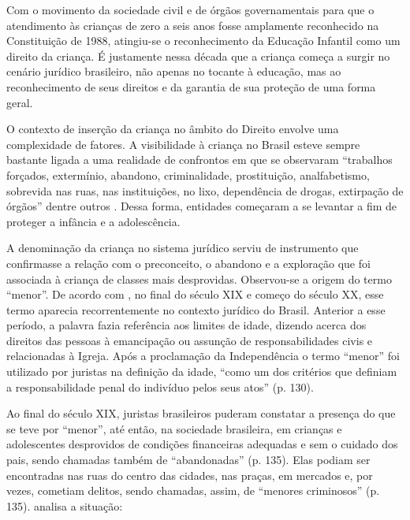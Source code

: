 
Com o movimento da sociedade civil e de órgãos governamentais para que o atendimento às crianças de zero a seis anos fosse amplamente reconhecido na Constituição de 1988, atingiu-se o reconhecimento da Educação Infantil como um direito da criança. É justamente nessa década que a criança começa a surgir no cenário jurídico brasileiro, não apenas no tocante à educação, mas ao reconhecimento de seus direitos e da garantia de sua proteção de uma forma geral. 

O contexto de inserção da criança no âmbito do Direito envolve uma complexidade de fatores. A visibilidade à criança no Brasil esteve sempre bastante ligada a uma realidade de confrontos em que se observaram ``trabalhos forçados, extermínio, abandono, criminalidade, prostituição, analfabetismo, sobrevida nas ruas, nas instituições, no lixo, dependência de drogas, extirpação de órgãos'' dentre outros \cite[p. 40]{SANTOS1994}. Dessa forma, entidades começaram a se levantar a fim de proteger a infância e a adolescência.

A denominação da criança no sistema jurídico serviu de instrumento que confirmasse a relação com o preconceito, o abandono e a exploração que foi associada à criança de classes mais desprovidas. Observou-se a origem do termo ``menor''. De acordo com , no final do século XIX e começo do século XX, esse termo aparecia recorrentemente no contexto jurídico do Brasil. Anterior a esse período, a palavra fazia referência aos limites de idade, dizendo acerca dos direitos das pessoas à emancipação ou assunção de responsabilidades civis e relacionadas à Igreja. Após a proclamação da Independência o termo ``menor'' foi utilizado por juristas na definição da idade, ``como um dos critérios que definiam a responsabilidade penal do indivíduo pelos seus atos'' (p. 130).

Ao final do século XIX, juristas brasileiros puderam constatar a presença do que se teve por ``menor'', até então, na sociedade brasileira, em crianças e adolescentes desprovidos de condições financeiras adequadas e sem o cuidado dos pais, sendo chamadas também de ``abandonadas'' (p. 135). Elas podiam ser encontradas nas ruas do centro das cidades, nas praças, em mercados e, por vezes, cometiam delitos, sendo chamadas, assim, de ``menores criminosos'' (p. 135).  analisa a situação:

